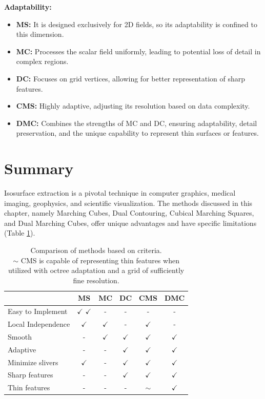 \noindent \textbf{Adaptability:}
\begin{itemize}
\item \textbf{MS:} It is designed exclusively for 2D fields, so its adaptability is confined to this dimension.
\item \textbf{MC:} Processes the scalar field uniformly, leading to potential loss of detail in complex regions.
\item \textbf{DC:} Focuses on grid vertices, allowing for better representation of sharp features.
\item \textbf{CMS:} Highly adaptive, adjusting its resolution based on data complexity.
\item \textbf{DMC:} Combines the strengths of MC and DC, ensuring adaptability, detail preservation, and the unique capability to represent thin surfaces or features.
\end{itemize}

\section{Summary}
Isosurface extraction is a pivotal technique in computer graphics, medical imaging, geophysics, and scientific visualization. The methods discussed in this chapter, namely Marching Cubes, Dual Contouring, Cubical Marching Squares, and Dual Marching Cubes, offer unique advantages and have specific limitations (Table \ref{table:comparison-of-methods}). 

\renewcommand{\arraystretch}{1.5}
\begin{table}[H]
\centering
\begin{tabular}{l|c|c|c|c|c}
 & MS & MC & DC & CMS & DMC \\
\hline
Easy to Implement & $\checkmark$ $\checkmark$ & - & - & - & - \\
Local Independence & $\checkmark$ & $\checkmark$ & - & $\checkmark$ & - \\
Smooth & - & $\checkmark$ & $\checkmark$ & $\checkmark$ & $\checkmark$ \\
Adaptive & - & - & $\checkmark$ & $\checkmark$ & $\checkmark$ \\
Minimize slivers & $\checkmark$ & - & $\checkmark$ & $\checkmark$ & $\checkmark$ \\
Sharp features & - & - & $\checkmark$ & $\checkmark$ & $\checkmark$ \\
Thin features & - & - & - & $ \sim $ & $\checkmark$ \\
\end{tabular}
\caption{Comparison of methods based on criteria. \\
$ \sim $  CMS is capable of representing thin features when utilized with octree adaptation and a grid of sufficiently fine resolution.
} \label{table:comparison-of-methods}
\end{table}

